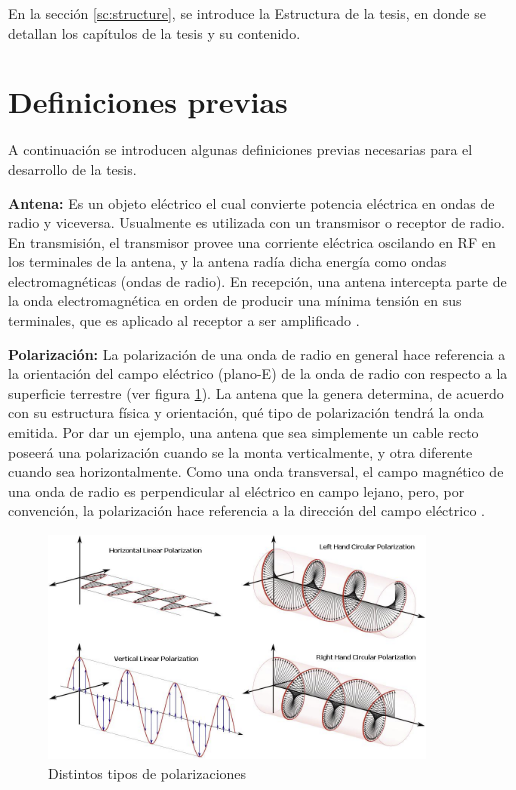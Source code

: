 En la sección \ref{sc:structure}, se introduce la Estructura de la tesis, en donde se detallan los capítulos de la tesis y su
contenido.


\section{Definiciones previas} \label{sc:definitions}

A continuación se introducen algunas definiciones previas necesarias para el desarrollo de la tesis.


{\textbf{Antena:}} Es un objeto eléctrico el cual convierte potencia eléctrica en ondas de radio y viceversa. Usualmente es
utilizada con un transmisor o receptor de radio. En transmisión, el transmisor provee una corriente eléctrica oscilando en
RF en los terminales de la antena, y la antena radía dicha energía como ondas electromagnéticas (ondas de radio). En
recepción, una antena intercepta parte de la onda electromagnética en orden de producir una mínima tensión en sus terminales,
que es aplicado al receptor a ser amplificado \cite{AntennaWiki}.

{\textbf{Polarización:}} La polarización de una onda de radio en general hace referencia a la orientación del campo
eléctrico (plano-E) de la onda de radio con respecto a la superficie terrestre (ver figura \ref{fig:hvPolarizations}). La antena
que la genera determina, de acuerdo con su estructura física y orientación, qué tipo de polarización tendrá la onda emitida.
Por dar un ejemplo, una antena que sea simplemente un cable recto poseerá una polarización cuando se la monta verticalmente, y
otra diferente cuando sea horizontalmente. Como una onda transversal, el campo magnético de una onda de radio es perpendicular
al eléctrico en campo lejano, pero, por convención, la polarización hace referencia a la dirección del campo eléctrico
\cite{AntennaWiki}.

\begin{figure}[H]
 \centering
 \includegraphics[width=10cm]{gfx/polarizations.png}
 \caption{Distintos tipos de polarizaciones \cite{polarization}}
 \label{fig:hvPolarizations}
\end{figure}

